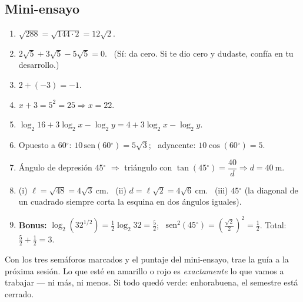 \documentclass[11pt,a4paper]{article}
\newcommand{\gr}{\ensuremath{^{\circ}}}
\begin{document}
\subsection*{Mini-ensayo}

\begin{tcolorbox}[propiedad, title={Soluciones y puntaje}]
\begin{enumerate}[nosep,itemsep=3pt]
  \item $\sqrt{288} = \sqrt{144\cdot 2} = 12\sqrt{2}$.
  \item $2\sqrt{5} + 3\sqrt{5} - 5\sqrt{5} = 0$. \ (Sí: da cero. Si te dio cero y dudaste, confía en tu desarrollo.)
  \item $2 + (-3) = -1$.
  \item $x + 3 = 5^2 = 25 \Rightarrow x = 22$.
  \item $\log_2 16 + 3\log_2 x - \log_2 y = 4 + 3\log_2 x - \log_2 y$.
  \item Opuesto a $60\gr $: $10\,\mathrm{sen}(60\gr ) = 5\sqrt{3}$; \ adyacente: $10\cos(60\gr ) = 5$.
  \item Ángulo de depresión $45\gr $ $\Rightarrow$ triángulo con $\tan(45\gr ) = \dfrac{40}{d} \Rightarrow d = 40\ \text{m}$.
  \item (i) $\ell = \sqrt{48} = 4\sqrt{3}\ \text{cm}$. \
  (ii) $d = \ell\sqrt{2} = 4\sqrt{6}\ \text{cm}$. \
  (iii) $45\gr $ (la diagonal de un cuadrado siempre corta la esquina en dos ángulos iguales).
  \item \textbf{Bonus:} $\log_2\!\left(32^{1/2}\right) = \tfrac{1}{2}\log_2 32 = \tfrac{5}{2}$; \ $\mathrm{sen}^2(45\gr ) = \left(\tfrac{\sqrt{2}}{2}\right)^{2} = \tfrac{1}{2}$.
  Total: $\tfrac{5}{2} + \tfrac{1}{2} = 3$.
\end{enumerate}
\end{tcolorbox}

\begin{tcolorbox}[recuerda, title={\color{black} ÚLTIMO PASO}]
Con los tres semáforos marcados y el puntaje del mini-ensayo, trae la guía a la próxima sesión. Lo que esté en amarillo o rojo es \emph{exactamente} lo que vamos a trabajar --- ni más, ni menos. Si todo quedó verde: enhorabuena, el semestre está cerrado.
\end{tcolorbox}
\end{document}
